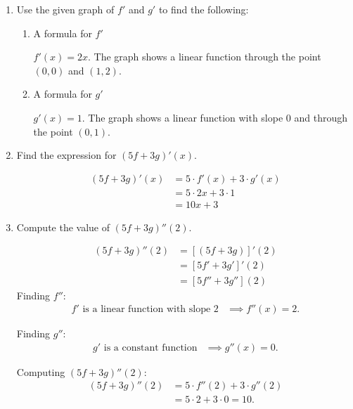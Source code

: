 \documentclass[nooutcomes,handout]{ximera}
\begin{document}
\begin{problem}
\begin{enumerate}
	\item Use the given graph of $f'$ and $g'$ to find the following:
	\begin{enumerate}
		\item A formula for $f'$
			\begin{freeResponse}
				$f'(x)=2x$.  The graph shows a linear function through the point $(0,0)$ and $(1,2)$.
			\end{freeResponse}
	
		\item A formula for $g'$
			\begin{freeResponse}
				$g'(x)=1$.  The graph shows a linear function with slope $0$ and through the point $(0,1)$.
			\end{freeResponse}
	\end{enumerate}

	\item Find the expression for $(5f+3g)'(x)$.
	
	\begin{freeResponse}
         \begin{align*}
           (5f+3g)'(x) &= 5\cdot f'(x) + 3 \cdot g'(x)\\
                       &= 5 \cdot 2x + 3 \cdot 1 \\
                       &= 10x+3
         \end{align*}
	\end{freeResponse}

     \item
       Compute the value of $(5f+3g)''(2)$.
       \begin{freeResponse}
         \begin{align*}
		(5f+3g)''(2)&=[(5f+3g)]'(2)\\
		&=[5f'+3g']'(2)\\
		&=[5f''+3g''](2)
	\end{align*}
	Finding $f''$:
         \begin{align*}
           \mbox{$f'$ is a linear function with slope 2} &\implies f''(x) = 2.
         \end{align*}

         Finding $g''$:
         \begin{align*}
           \mbox{$g'$ is a constant function} &\implies g''(x) = 0.
         \end{align*}
         
         Computing $(5f+3g)''(2)$:
         \begin{align*}
           (5f+3g)''(2) &= 5\cdot f''(2) + 3 \cdot g''(2) \\
                        &= 5 \cdot 2 + 3 \cdot 0 = 10.
         \end{align*}
       \end{freeResponse}


   \end{enumerate}

\end{problem}
\end{document}
